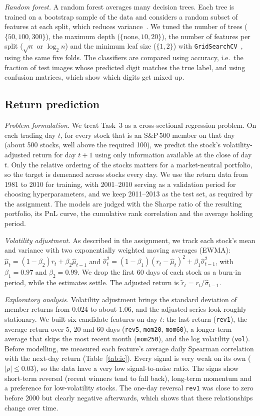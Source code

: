 \documentclass[conference]{IEEEtran}
\begin{document}
\textit{Random forest.} A random forest averages many decision trees. Each tree is trained on a bootstrap sample of the data and considers a random subset of features at each split, which reduces variance~\cite{skRF}. We tuned the number of trees ($\{50,100,300\}$), the maximum depth ($\{\text{none},10,20\}$), the number of features per split ($\sqrt{n}$ or $\log_2 n$) and the minimum leaf size ($\{1,2\}$) with \texttt{GridSearchCV}~\cite{skGS}, using the same five folds. The classifiers are compared using accuracy, i.e.\ the fraction of test images whose predicted digit matches the true label, and using confusion matrices, which show which digits get mixed up.

\subsection{Return prediction}
\textit{Problem formulation.} We treat Task~3 as a cross-sectional regression problem. On each trading day $t$, for every stock that is an S\&P\,500 member on that day (about 500 stocks, well above the required 100), we predict the stock's volatility-adjusted return for day $t+1$ using only information available at the close of day $t$. Only the relative ordering of the stocks matters for a market-neutral portfolio, so the target is demeaned across stocks every day. We use the return data from 1981 to 2010 for training, with 2001--2010 serving as a validation period for choosing hyperparameters, and we keep 2011--2013 as the test set, as required by the assignment. The models are judged with the Sharpe ratio of the resulting portfolio, its PnL curve, the cumulative rank correlation and the average holding period.

\textit{Volatility adjustment.} As described in the assignment, we track each stock's mean and variance with two exponentially weighted moving averages (EWMA): $\hat\mu_t=(1-\beta_2)r_t+\beta_2\hat\mu_{t-1}$ and $\hat\sigma_t^2=(1-\beta_1)(r_t-\hat\mu_t)^2+\beta_1\hat\sigma_{t-1}^2$, with $\beta_1=0.97$ and $\beta_2=0.99$. We drop the first 60 days of each stock as a burn-in period, while the estimates settle. The adjusted return is $\tilde r_t=r_t/\hat\sigma_{t-1}$.

\textit{Exploratory analysis.} Volatility adjustment brings the standard deviation of member returns from 0.024 to about 1.06, and the adjusted series look roughly stationary. We built six candidate features on day $t$: the last return (\texttt{rev1}), the average return over 5, 20 and 60 days (\texttt{rev5}, \texttt{mom20}, \texttt{mom60}), a longer-term average that skips the most recent month (\texttt{mom250}), and the log volatility (\texttt{vol}). Before modelling, we measured each feature's average daily Spearman correlation with the next-day return (Table~\ref{tab:ic}). Every signal is very weak on its own ($|\rho|\le0.03$), so the data have a very low signal-to-noise ratio. The signs show short-term reversal (recent winners tend to fall back), long-term momentum and a preference for low-volatility stocks. The one-day reversal \texttt{rev1} was close to zero before 2000 but clearly negative afterwards, which shows that these relationships change over time.
\end{document}
